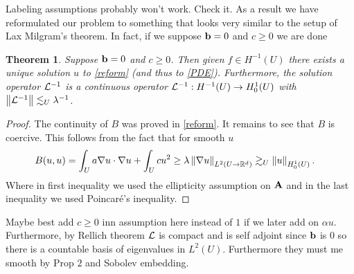 \documentclass[12pt]{article}
\newtheorem{theorem}{Theorem}[section]
\theoremstyle{definition}
\newcommand{\red}[1]{{\color{red}#1}}
\renewcommand{\norm}[1]{\left\lVert #1 \right\rVert}\renewcommand{\abs}[1]{\left| #1 \right|}
\begin{document}
\red{Labeling assumptions probably won't work. Check it.}
As a result we have reformulated our problem to something that looks very similar to the setup of Lax Milgram's theorem. In fact, if we suppose $\vb{b}=0$ and $c \geq 0$ we are done
\begin{theorem}
	Suppose $\vb{b}=0$  and $c \geq 0$. Then given $f \in  H^{-1}(U)$ there exists a unique solution $u$ to \eqref{reform} (and thus to \eqref{PDE}). Furthermore, the solution operator $\mathcal{L}^{-1}$ is a continuous operator	 $\mathcal{L}^{-1}: H^{-1}(U) \to H^1_0(U)$ with $\norm{\Ll^{-1}} \lesssim_U \lambda ^{-1}$.
\end{theorem}
\begin{proof}
	The continuity of $B$ was proved in  \eqref{reform}. It remains to see that $B$ is coercive. This follows from the fact that for smooth $u$
	\begin{align}\label{b=0}
		B(u,u) & = \int_{U}a \nabla u \cdot \nabla u + \int_{U} cu^2 \geq \lambda \norm{\nabla u}_{L^2(U \to \R^d)} \gtrsim_U \norm{u}_{H^1_0(U)}.
	\end{align}
	Where in first inequality we used the ellipticity assumption on $\vb{A}$ and in the last inequality we used Poincaré's inequality.
\end{proof}
\red{Maybe best add $c \geq 0$ inn assumption here instead of $1$ if we later add on  $\alpha u$.}
Furthermore, by Rellich theorem $\mathcal{L}$ is compact and is self adjoint since $\vb{b}$ is  $0$ so there is a countable basis of eigenvalues in  $L^2(U)$. Furthermore they must me smooth by Prop  $2$ and Sobolev embedding.
\end{document}

